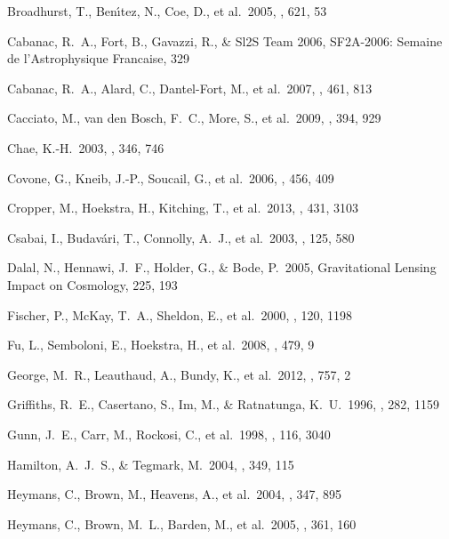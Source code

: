 \documentclass[apj]{emulateapj}
\begin{document}
\begin{thebibliography}{}
  Broadhurst, T.,
  Ben{\'{\i}}tez, N., Coe, D., et al.\ 2005, \apj, 621, 53


  Cabanac, R.~A., Fort,
  B., Gavazzi, R., \& Sl2S Team 2006, SF2A-2006: Semaine de l'Astrophysique Francaise, 329


  Cabanac,
  R.~A., Alard, C., Dantel-Fort, M., et al.\ 2007, \aap, 461, 813

  Cacciato, M., van den
  Bosch, F.~C., More, S., et al.\ 2009, \mnras, 394, 929

  Chae, K.-H.\ 2003, \mnras, 346,
   746

  Covone, G.,
  Kneib, J.-P., Soucail, G., et al.\ 2006, \aap, 456, 409

 Cropper, M., Hoekstra,
H., Kitching, T., et al.\ 2013, \mnras, 431, 3103


  Csabai, I.,
   Budav{\'a}ri, T., Connolly, A.~J., et al.\ 2003, \aj, 125, 580

  Dalal, N., Hennawi,
  J.~F., Holder, G., \& Bode, P.\ 2005, Gravitational Lensing Impact on Cosmology, 225, 193

  Fischer, P., McKay,
T.~A., Sheldon, E., et al.\ 2000, \aj, 120, 1198

  Fu, L.,
  Semboloni, E., Hoekstra, H., et al.\ 2008, \aap, 479, 9

  George, M.~R.,
  Leauthaud, A., Bundy, K., et al.\ 2012, \apj, 757, 2

  Griffiths, R.~E.,
  Casertano, S., Im, M., \& Ratnatunga, K.~U.\ 1996, \mnras, 282, 1159

  Gunn, J.~E., Carr, M.,
  Rockosi, C., et al.\ 1998, \aj, 116, 3040

 Hamilton, A.~J.~S., \& Tegmark, M.\ 2004, \mnras, 349, 115

  Heymans, C., Brown, M.,
  Heavens, A., et al.\ 2004, \mnras, 347, 895

  Heymans, C., Brown,
  M.~L., Barden, M., et al.\ 2005, \mnras, 361, 160


\end{thebibliography}
\end{document}
